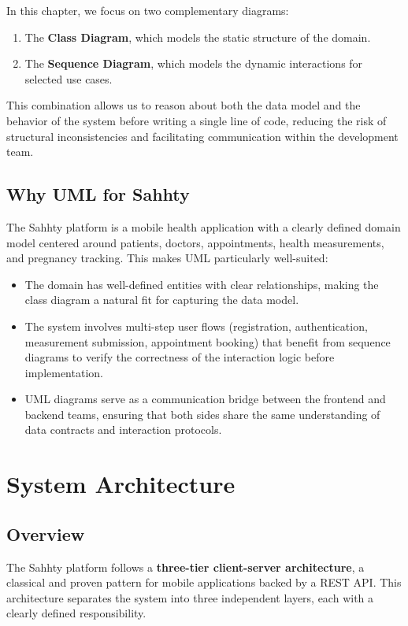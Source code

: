 In this chapter, we focus on two complementary diagrams:
\begin{enumerate}
    \item The \textbf{Class Diagram}, which models the static structure of the domain.
    \item The \textbf{Sequence Diagram}, which models the dynamic interactions for selected use cases.
\end{enumerate}

This combination allows us to reason about both the data model and the behavior of the system before writing a single line of code, reducing the risk of structural inconsistencies and facilitating communication within the development team.

\subsection{Why UML for Sahhty}

The Sahhty platform is a mobile health application with a clearly defined domain model centered around patients, doctors, appointments, health measurements, and pregnancy tracking. This makes UML particularly well-suited:

\begin{itemize}
    \item The domain has well-defined entities with clear relationships, making the class diagram a natural fit for capturing the data model.
    \item The system involves multi-step user flows (registration, authentication, measurement submission, appointment booking) that benefit from sequence diagrams to verify the correctness of the interaction logic before implementation.
    \item UML diagrams serve as a communication bridge between the frontend and backend teams, ensuring that both sides share the same understanding of data contracts and interaction protocols.
\end{itemize}

\section{System Architecture}

\subsection{Overview}

The Sahhty platform follows a \textbf{three-tier client-server architecture}, a classical and proven pattern for mobile applications backed by a REST API. This architecture separates the system into three independent layers, each with a clearly defined responsibility.

